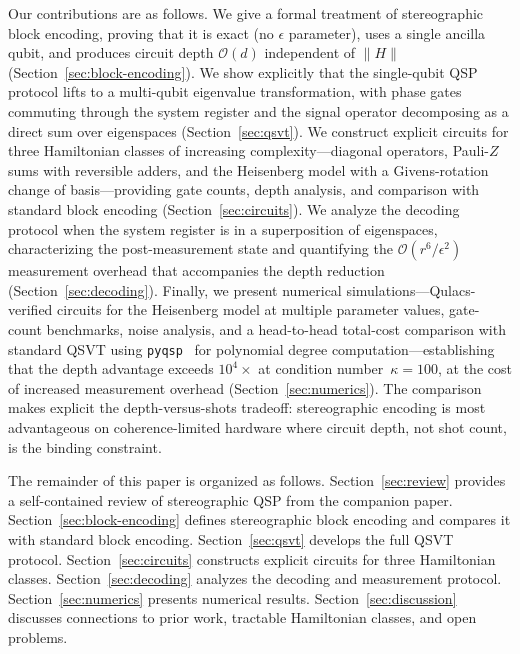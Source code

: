 Our contributions are as follows.  We give a formal treatment of
stereographic block encoding, proving that it is exact (no
$\epsilon$ parameter), uses a single ancilla qubit, and produces
circuit depth $\mathcal{O}(d)$ independent of $\|H\|$
(Section~\ref{sec:block-encoding}).  We show explicitly that the
single-qubit QSP protocol lifts to a multi-qubit eigenvalue
transformation, with phase gates commuting through the system
register and the signal operator decomposing as a direct sum over
eigenspaces (Section~\ref{sec:qsvt}).  We construct explicit
circuits for three Hamiltonian classes of increasing
complexity---diagonal operators, Pauli-$Z$ sums with reversible
adders, and the Heisenberg model with a Givens-rotation change of
basis---providing gate counts, depth analysis, and comparison with
standard block encoding (Section~\ref{sec:circuits}).  We analyze
the decoding protocol when the system register is in a superposition
of eigenspaces, characterizing the post-measurement state and
quantifying the $\mathcal{O}(r^6/\epsilon^2)$ measurement overhead
that accompanies the depth reduction
(Section~\ref{sec:decoding}).  Finally, we present numerical
simulations---Qulacs-verified circuits for the Heisenberg model at
multiple parameter values, gate-count benchmarks, noise analysis,
and a head-to-head total-cost comparison with standard QSVT using
\texttt{pyqsp}~\cite{Martyn2024} for polynomial degree
computation---establishing that the depth advantage exceeds
$10^4\times$ at condition number~$\kappa = 100$, at the cost of
increased measurement overhead
(Section~\ref{sec:numerics}).  The comparison makes explicit the
depth-versus-shots tradeoff: stereographic encoding is most
advantageous on coherence-limited hardware where circuit depth, not
shot count, is the binding constraint.


The remainder of this paper is organized as follows.
Section~\ref{sec:review} provides a self-contained review of
stereographic QSP from the companion paper.
Section~\ref{sec:block-encoding} defines stereographic block
encoding and compares it with standard block encoding.
Section~\ref{sec:qsvt} develops the full QSVT protocol.
Section~\ref{sec:circuits} constructs explicit circuits for three
Hamiltonian classes.
Section~\ref{sec:decoding} analyzes the decoding and measurement
protocol.
Section~\ref{sec:numerics} presents numerical results.
Section~\ref{sec:discussion} discusses connections to prior work,
tractable Hamiltonian classes, and open problems.
